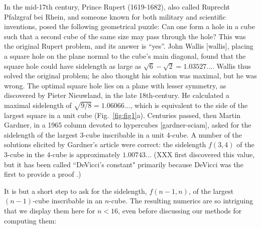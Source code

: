 \documentclass[superscriptaddress,reprint,amsmath,amssymb,aps]{revtex4-1}
\begin{document}
\vspace{.15in}

In the mid-17th century, Prince Rupert (1619-1682), also called Ruprecht Pfalzgraf bei Rhein, and someone known for both military and scientific inventions, posed the following geometrical puzzle: Can one form a hole in a cube such that a second cube of the same size may pass through the hole?
This was the original Rupert problem, and its answer is ``yes''.  John Wallis [wallis], placing a square hole on the plane normal to the cube's main diagonal, found that the square hole could have sidelength as large as $\sqrt{6}-\sqrt{2}=1.03527...$.  Wallis thus solved the original problem; he also thought his solution was maximal, but he was wrong.  The optimal square hole lies on a plane with lesser symmetry, as discovered by Pieter Nieuwland, in the late 18th-century.  He calculated a maximal sidelength of $\sqrt{9/8} = 1.06066...$, which is equivalent to the side of the largest square in a unit cube (Fig.~\ref{fig:fig1}a). Centuries passed, then Martin Gardner, in a 1965 column devoted to hypercubes [gardner-sciam], asked for the sidelength of the largest 3-cube inscribable in a unit 4-cube. A number of the solutions elicited by Gardner's article were correct: the sidelength $f(3,4)$ of the 3-cube in the 4-cube is approximately $1.00743...$ (XXX first discovered this value, but it has been called ``DeVicci's constant" \cite{finch} primarily because DeVicci was the first to provide a proof \cite{devicci-shultz}.)

\vspace{.15in}

It is but a short step to ask for the sidelength, $f(n-1,n)$, of the largest $(n-1)$-cube inscribable in an $n$-cube.  The resulting numerics are so intriguing that we display them here for $n<16$, even before discussing our methods for computing them:
\end{document}

